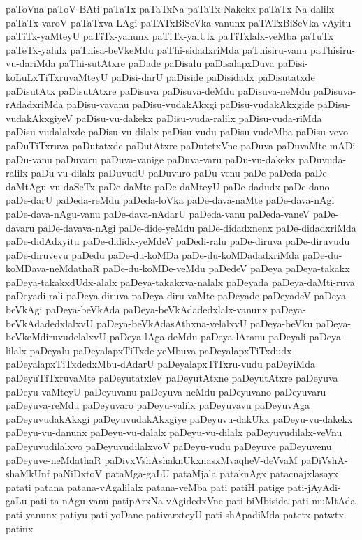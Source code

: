 {paToVna
paToV-BAti
paTaTx
paTaTxNa
paTaTx-Nakekx
paTaTx-Na-dalilx
paTaTx-varoV
paTaTxva-LAgi
paTATxBiSeVka-vanunx
paTATxBiSeVka-vAyitu
paTiTx-yaMteyU
paTiTx-yanunx
paTiTx-yalUlx
paTiTxlalx-veMba
paTuTx
paTeTx-yalulx
paThisa-beVkeMdu
paThi-sidadxriMda
paThisiru-vanu
paThisiru-vu-dariMda
paThi-sutAtxre
paDade
paDisalu
paDisalapxDuva
paDisi-koLuLxTiTxruvaMteyU
paDisi-darU
paDiside
paDisidadx
paDisutatxde
paDisutAtx
paDisutAtxre
paDisuva
paDisuva-deMdu
paDisuva-neMdu
paDisuva-rAdadxriMda
paDisu-vavanu
paDisu-vudakAkxgi
paDisu-vudakAkxgide
paDisu-vudakAkxgiyeV
paDisu-vu-dakekx
paDisu-vuda-ralilx
paDisu-vuda-riMda
paDisu-vudalalxde
paDisu-vu-dilalx
paDisu-vudu
paDisu-vudeMba
paDisu-vevo
paDuTiTxruva
paDutatxde
paDutAtxre
paDutetxVne
paDuva
paDuvaMte-mADi
paDu-vanu
paDuvaru
paDuva-vanige
paDuva-varu
paDu-vu-dakekx
paDuvuda-ralilx
paDu-vu-dilalx
paDuvudU
paDuvuro
paDu-venu
paDe
paDeda
paDe-daMtAgu-vu-daSeTx
paDe-daMte
paDe-daMteyU
paDe-dadudx
paDe-dano
paDe-darU
paDeda-reMdu
paDeda-loVka
paDe-dava-naMte
paDe-dava-nAgi
paDe-dava-nAgu-vanu
paDe-dava-nAdarU
paDeda-vanu
paDeda-vaneV
paDe-davaru
paDe-davava-nAgi
paDe-dide-yeMdu
paDe-didadxnenx
paDe-didadxriMda
paDe-didAdxyitu
paDe-dididx-yeMdeV
paDedi-ralu
paDe-diruva
paDe-diruvudu
paDe-diruvevu
paDedu
paDe-du-koMDa
paDe-du-koMDadadxriMda
paDe-du-koMDava-neMdathaR
paDe-du-koMDe-veMdu
paDedeV
paDeya
paDeya-takakx
paDeya-takakxdUdx-alalx
paDeya-takakxva-nalalx
paDeyada
paDeya-daMti-ruva
paDeyadi-rali
paDeya-diruva
paDeya-diru-vaMte
paDeyade
paDeyadeV
paDeya-beVkAgi
paDeya-beVkAda
paDeya-beVkAdadedxlalx-vanunx
paDeya-beVkAdadedxlalxvU
paDeya-beVkAdasAthxna-velalxvU
paDeya-beVku
paDeya-beVkeMdiruvudelalxvU
paDeya-lAga-deMdu
paDeya-lAranu
paDeyali
paDeya-lilalx
paDeyalu
paDeyalapxTiTxde-yeMbuva
paDeyalapxTiTxdudx
paDeyalapxTiTxdedxMbu-dAdarU
paDeyalapxTiTxru-vudu
paDeyiMda
paDeyuTiTxruvaMte
paDeyutatxleV
paDeyutAtxne
paDeyutAtxre
paDeyuva
paDeyu-vaMteyU
paDeyuvanu
paDeyuva-neMdu
paDeyuvano
paDeyuvaru
paDeyuva-reMdu
paDeyuvaro
paDeyu-valilx
paDeyuvavu
paDeyuvAga
paDeyuvudakAkxgi
paDeyuvudakAkxgiye
paDeyuvu-dakUkx
paDeyu-vu-dakekx
paDeyu-vu-danunx
paDeyu-vu-dalalx
paDeyu-vu-dilalx
paDeyuvudilalx-veVnu
paDeyuvudilalxvo
paDeyuvudilalxvoV
paDeyu-vudu
paDeyuve
paDeyuvenu
paDeyuve-neMdathaR
paDivxVshAshaknUkxnasxMvaqheV-deVvaM
paDiVshA-shaMkUnf
paNiDxtoV
pataMga-gaLU
pataMjala
pataknAgx
patacnajxlasayx
patati
patana
patana-vAgalilalx
patana-veMba
pati
patiH
patige
pati-jAyAdi-gaLu
pati-ta-nAgu-vanu
patipArxNa-vAgidedxVne
pati-biMbisida
pati-muMtAda
pati-yanunx
patiyu
pati-yoDane
pativarxteyU
pati-shApadiMda
patetx
patwtx
patinx
}
